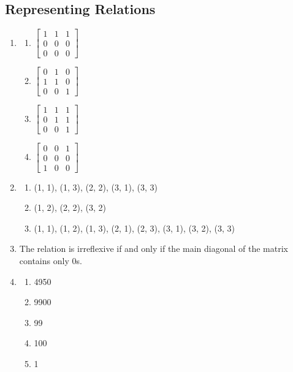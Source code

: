 \documentclass{../../cls/sig-alternate-05-2015}
\begin{document}
\subsection{Representing Relations}
\begin{enumerate}
\item 
\begin{enumerate}
	\item 
	$\begin{bmatrix}
		1 & 1 & 1\\
		0 & 0 & 0\\
		0 & 0 & 0
	\end{bmatrix}$
	\item 
	$\begin{bmatrix}
	0 & 1 & 0\\
	1 & 1 & 0\\
	0 & 0 & 1
	\end{bmatrix}$
	\item 
	$\begin{bmatrix}
	1 & 1 & 1\\
	0 & 1 & 1\\
	0 & 0 & 1
	\end{bmatrix}$
	\item 
	$\begin{bmatrix}
	0 & 0 & 1\\
	0 & 0 & 0\\
	1 & 0 & 0
	\end{bmatrix}$
\end{enumerate}

\item \begin{enumerate}
	\item (1, 1), (1, 3), (2, 2), (3, 1), (3, 3) 
	\item (1, 2), (2, 2), (3, 2)
	\item (1, 1), (1, 2), (1, 3), (2, 1), (2, 3), (3, 1), (3, 2),
	(3, 3)
\end{enumerate}

\item The relation is irreflexive if and only if the main diagonal of the matrix contains only $0$s.

\item \begin{enumerate}
	\item 4950 
	\item 9900
	\item 99
	\item 100
	\item 1
\end{enumerate}


\end{enumerate}
\end{document}
